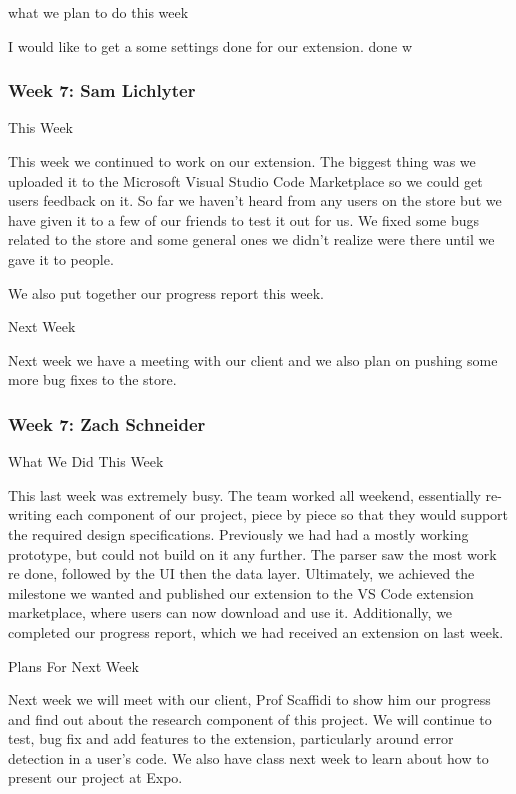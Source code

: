 what we plan to do this week 



I would like to get a some settings done for our extension. done w \\ 

 \subsubsection{Week 7: Sam Lichlyter}

This Week

This week we continued to work on our extension. The biggest thing was we uploaded it to the Microsoft Visual Studio Code Marketplace so we could get users feedback on it. So far we haven't heard from any users on the store but we have given it to a few of our friends to test it out for us. We fixed some bugs related to the store and some general ones we didn't realize were there until we gave it to people. 



We also put together our progress report this week.



Next Week

Next week we have a meeting with our client and we also plan on pushing some more bug fixes to the store. \\ 

 \subsubsection{Week 7: Zach Schneider}

What We Did This Week

This last week was extremely busy. The team worked all weekend, essentially re-writing each component of our project, piece by piece so that they would support the required design specifications. Previously we had had a mostly working prototype, but could not build on it any further. The parser saw the most work re done, followed by the UI then the data layer. Ultimately, we achieved the milestone we wanted and published our extension to the VS Code extension marketplace, where users can now download and use it. Additionally, we completed our progress report, which we had received an extension on last week.



Plans For Next Week

Next week we will meet with our client, Prof Scaffidi to show him our progress and find out about the research component of this project. We will continue to test, bug fix and add features to the extension, particularly around error detection in a user's code. We also have class next week to learn about how to present our project at Expo. \\ 


